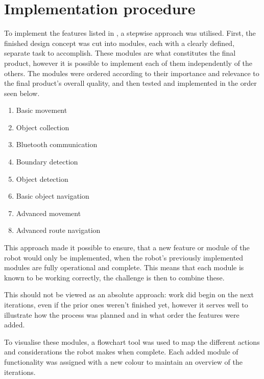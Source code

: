 \section{Implementation procedure} \label{sec:imp-procedure}

To implement the features listed in , a stepwise approach was utilised. First, the finished design concept was cut into modules, each with a clearly defined, separate task to accomplish. These modules are what constitutes the final product, however it is possible to implement each of them independently of the others. The modules were ordered according to their importance and relevance to the final product's overall quality, and then tested and implemented in the order seen below.

\begin{enumerate}
\item Basic movement
\item Object collection
\item Bluetooth communication
\item Boundary detection
\item Object detection
\item Basic object navigation
\item Advanced movement
\item Advanced route navigation
\end{enumerate}

This approach made it possible to ensure, that a new feature or module of the robot would only be implemented, when the robot's previously implemented modules are fully operational and complete. This means that each module is known to be working correctly, the challenge is then to combine these. 

This should not be viewed as an absolute approach: work did begin on the next iterations, even if the prior ones weren't finished yet, however it serves well to illustrate how the process was planned and in what order the features were added.

To visualise these modules, a flowchart tool was used to map the different actions and considerations the robot makes when complete. Each added module of functionality was assigned with a new colour to maintain an overview of the iterations. 

